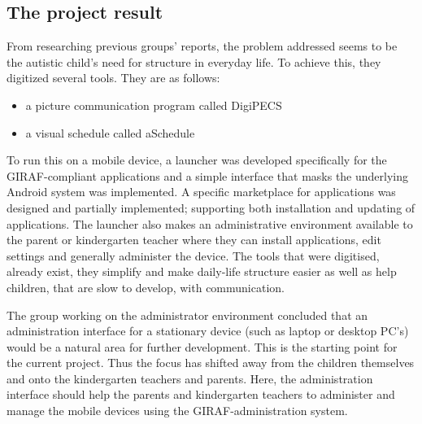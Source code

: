 \subsection{The project result}
From researching previous groups' reports, the problem addressed seems to be the autistic child's need for structure in everyday life. To achieve this, they digitized several tools. They are as follows:
\begin{itemize}
	\item a picture communication program called DigiPECS
	\item a visual schedule called aSchedule
\end{itemize}

To run this on a mobile device, a launcher was developed specifically for the GIRAF-compliant applications and a simple interface that masks the underlying Android system was implemented. A specific marketplace for applications was designed and partially implemented; supporting both installation and updating of applications. The launcher also makes an administrative environment available to the parent or kindergarten teacher where they can install applications, edit settings and generally administer the device.
The tools that were digitised, already exist, they simplify and make daily-life structure easier as well as help children, that are slow to develop, with communication.

The group working on the administrator environment concluded that an administration interface for a stationary device (such as laptop or desktop PC's) would be a natural area for further development. This is the starting point for the current project.
Thus the focus has shifted away from the children themselves and onto the kindergarten teachers and parents. Here, the administration interface should help the parents and kindergarten teachers to administer and manage the mobile devices using the GIRAF-administration system.\cite{giraffactors}

